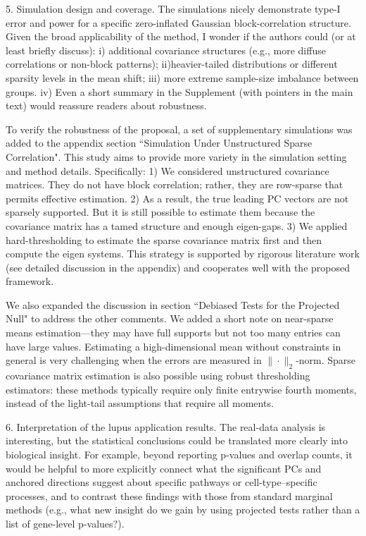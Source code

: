 \documentclass{article}
\theoremstyle{definition}
\begin{document}
\begin{shaded}  
5. Simulation design and coverage.
The simulations nicely demonstrate type-I error and power for a specific zero-inflated Gaussian block-correlation structure. Given the broad applicability of the method, I wonder if the authors could (or at least briefly discuss): i) additional covariance structures (e.g., more diffuse correlations or non-block patterns); ii)heavier-tailed distributions or different sparsity levels in the mean shift; iii) more extreme sample-size imbalance between groups. iv) Even a short summary in the Supplement (with pointers in the main text) would reassure readers about robustness.
\end{shaded}

To verify the robustness of the proposal, a set of supplementary simulations was added to the appendix section ``Simulation Under Unstructured Sparse Correlation". This study aims to provide more variety in the simulation setting and method details. Specifically: 1) We considered unstructured covariance matrices. They do not have block correlation; rather, they are row-sparse that permits effective estimation. 2) As a result, the true leading PC vectors are not sparsely supported. But it is still possible to estimate them because the covariance matrix has a tamed structure and enough eigen-gaps. 3) We applied hard-thresholding to estimate the sparse covariance matrix first and then compute the eigen systems. This strategy is supported by rigorous literature work (see detailed discussion in the appendix) and cooperates well with the proposed framework.

We also expanded the discussion in section ``Debiased Tests for the Projected Null" to address the other comments. We added a short note on near-sparse means estimation---they may have full supports but not too many entries can have large values. Estimating a high-dimensional mean without constraints in general is very challenging when the errors are measured in $\|\cdot\|_2$-norm. Sparse covariance matrix estimation is also possible using robust thresholding estimators: these methods typically require only finite entrywise fourth moments, instead of the light-tail assumptions that require all moments.

\begin{shaded}
6. Interpretation of the lupus application results.
The real-data analysis is interesting, but the statistical conclusions could be translated more clearly into biological insight. For example, beyond reporting p-values and overlap counts, it would be helpful to more explicitly connect what the significant PCs and anchored directions suggest about specific pathways or cell-type–specific processes, and to contrast these findings with those from standard marginal methods (e.g., what new insight do we gain by using projected tests rather than a list of gene-level p-values?).
\end{shaded}
\end{document}
